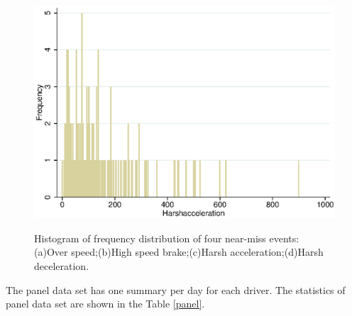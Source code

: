 \documentclass[num-refs]{wiley-article}
\begin{document}
\begin{figure}[htbp]
{\begin{minipage}[t]{0.35\textwidth}
		\includegraphics[width=1\textwidth]{Figure/Harshacceleration.eps} 
		\end{minipage}
		\label{frequency_c}
	}
	\caption{Histogram of frequency distribution of four near-miss events: (a)Over speed;(b)High speed brake;(c)Harsh acceleration;(d)Harsh deceleration.}
	\label{frequency}
\end{figure}

The panel data set has one summary per day for each driver. The statistics of panel data set are shown in the Table \ref{panel}.
\end{document}
